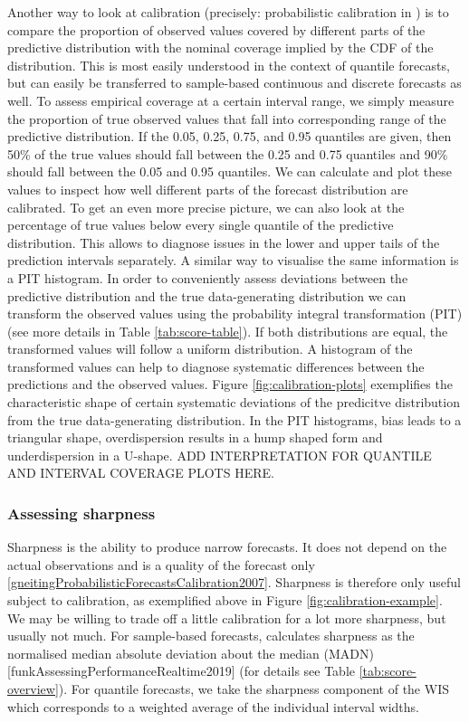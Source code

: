 \documentclass[article,shortnames]{jss}\usepackage[]{graphicx}\usepackage[]{color}
\begin{document}
Another way to look at calibration (precisely: probabilistic calibration in \cite{gneitingProbabilisticForecastsCalibration2007}) is to compare the proportion of observed values covered by different parts of the predictive distribution with the nominal coverage implied by the CDF of the distribution. This is most easily understood in the context of quantile forecasts, but can easily be transferred to sample-based continuous and discrete forecasts as well. 
%
To assess empirical coverage at a certain interval range, we simply measure the proportion of true observed values that fall into corresponding range of the predictive distribution. If the 0.05, 0.25, 0.75, and 0.95 quantiles are given, then 50\% of the true values should fall between the 0.25 and 0.75 quantiles and 90\% should fall between the 0.05 and 0.95 quantiles. We can calculate and plot these values to inspect how well different parts of the forecast distribution are calibrated. 
%
To get an even more precise picture, we can also look at the percentage of true values below every single quantile of the predictive distribution. This allows to diagnose issues in the lower and upper tails of the prediction intervals separately. A similar way to visualise the same information is a PIT histogram. In order to conveniently assess deviations between the predictive distribution and the true data-generating distribution we can transform the observed values using the probability integral transformation (PIT) \citep{dawidPresentPositionPotential1984} (see more details in Table \ref{tab:score-table}). If both distributions are equal, the transformed values will follow a uniform distribution. A histogram of the transformed values can help to diagnose systematic differences between the predictions and the observed values. Figure \ref{fig:calibration-plots} exemplifies the characteristic shape of certain systematic deviations of the predicitve distribution from the true data-generating distribution. In the PIT histograms, bias leads to a triangular shape, overdispersion results in a hump shaped form and underdispersion in a U-shape. ADD INTERPRETATION FOR QUANTILE AND INTERVAL COVERAGE PLOTS HERE. 

\subsubsection{Assessing sharpness}

Sharpness is the ability to produce narrow forecasts. It does not depend on the actual observations and is a quality of the forecast only \ref{gneitingProbabilisticForecastsCalibration2007}. Sharpness is therefore only useful subject to calibration, as exemplified above in Figure \ref{fig:calibration-example}. We may be willing to trade off a little calibration for a lot more sharpness, but usually not much. For sample-based forecasts,  calculates sharpness as the normalised median absolute deviation about the median (MADN) [funkAssessingPerformanceRealtime2019] (for details see Table \ref{tab:score-overview}). For quantile forecasts, we take the sharpness component of the WIS which corresponds to a weighted average of the individual interval widths. 
\end{document}
